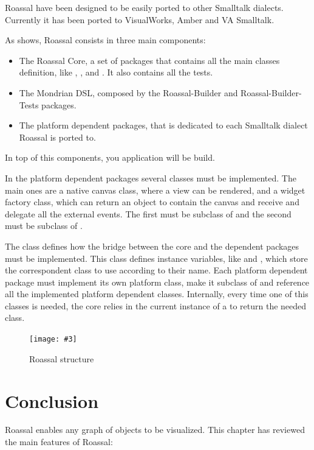 \documentclass[a4paper,10pt,twoside]{book}
\newcommand{\fig}[4]{
		\begin{figure}[#1]
			\centering
			\texttt{[image: \#3]}
			\caption{\label{fig:#3}#4}
		\end{figure}}
\begin{document}
Roassal have been designed to be easily ported to other Smalltalk dialects. Currently it has been ported to VisualWorks, Amber and VA Smalltalk.

As  shows, Roassal consists in three main components:

\begin{itemize}
\item  The Roassal Core, a set of packages that contains all the main classes definition, like , ,  and . It also contains all the tests.
\item The Mondrian DSL, composed by the Roassal-Builder and Roassal-Builder-Tests packages.
\item The platform dependent packages, that is dedicated to each Smalltalk dialect Roassal is ported to.
\end{itemize} 

In top of this components, you application will be build.

In the platform dependent packages several classes must be implemented. The main ones are a native canvas class, where a view can be rendered, and a widget factory class, which can return an object to contain the canvas and receive and delegate all the external events.
The first must be subclass of  and the second must be subclass of .

The  class defines how the bridge between the core and the dependent packages must be implemented. This class defines instance variables, like  and , which store the correspondent class to use according to their name. Each platform dependent package must implement its own platform class, make it subclass of  and reference all the implemented platform dependent classes.
Internally, every time one of this classes is needed, the core relies in the current instance of a  to return the needed class.

\fig{H}{0.3}{structure}{Roassal structure}


\section{Conclusion}

Roassal enables any graph of objects to be visualized. This chapter has reviewed the main features of Roassal:
\end{document}
